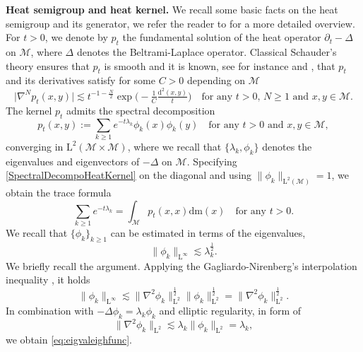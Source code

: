 \documentclass[11pt,a4paper,oneside]{amsart}
\numberwithin{equation}{section}
\newcommand{\dd}{\mathrm{d}}
\newcommand{\LL}{\mathrm{L}}
\newcommand{\m}{\mathrm{m}}
\begin{document}
\medskip
\noindent
\textbf{Heat semigroup and heat kernel. }We recall some basic facts on the heat semigroup and its generator, we refer the reader to \cite[Chapter VI]{chavel1984eigenvalues} for a more detailed overview. For $t>0$, we denote by $p_t$ the fundamental solution of the heat operator $\partial_t-\Delta$ on $\mathcal{M}$, where $\Delta$ denotes the Beltrami-Laplace operator. Classical Schauder's theory ensures that $p_t$ is smooth and it is known, see for instance \cite{stroock1998upper} and \cite[Appendix B]{ambrosio2019finer}, that $p_t$ and its derivatives satisfy for some $C>0$ depending on $\mathcal{M}$
%
\begin{equation}\label{Eq28}
%
\vert\nabla^N p_{t}(x,y)\vert\lesssim t^{-1-\frac{N}{2}}\exp\Big(-\tfrac{1}{C}\tfrac{\dd^2(x,y)}{t}\Big)\quad\text{for any $t>0$, $N\geq 1$ and $x,y\in\mathcal{M}$.}
\end{equation}
%
The kernel $p_t$ admits the spectral decomposition
%
\begin{equation}\label{SpectralDecompoHeatKernel}
%
p_{t}(x,y):=\sum_{k\geq 1}e^{-t\lambda_k}\phi_k(x)\phi_k(y)\quad \text{for any $t>0$ and $x,y\in\mathcal{M}$},
%
\end{equation}
%
converging in $\LL^2(\mathcal{M}\times\mathcal{M})$, where we recall that $\{\lambda_k,\phi_k\}$ denotes the eigenvalues and eigenvectors of $-\Delta$ on $\mathcal{M}$. Specifying \eqref{SpectralDecompoHeatKernel} on the diagonal and using $\|\phi_k\|_{\mathrm{L}^2(\mathcal{M})}=1$, we obtain the trace formula
%
\begin{equation}\label{eq:traceformula}
\sum_{k\geq 1}e^{-t\lambda_k}=\int_{\mathcal{M}}p_t(x,x)\dd\m(x)\quad\text{for any $t>0$.}
\end{equation}
%
We recall that $\{\phi_k\}_{k\geq 1}$ can be estimated in terms of the eigenvalues,
%
\begin{equation}\label{eq:eigvaleighfunc}
%
 \|\phi_k\|_{\LL^{\infty}}\lesssim \lambda^{\frac{1}{2}}_k.
%
\end{equation}
%
We briefly recall the argument. Applying the Gagliardo-Nirenberg's interpolation inequality \cite[Theorem 3.70]{aubin1998some}, it holds
%
$$\|\phi_k\|_{\LL^{\infty}}\lesssim \|\nabla^2 \phi_k\|^{\frac{1}{2}}_{\LL^{2}}\|\phi_k\|^{\frac{1}{2}}_{\LL^2}=\|\nabla^2\phi_k\|^{\frac{1}{2}}_{\LL^2}.$$
%
In combination with $-\Delta\phi_k=\lambda_k\phi_k$ and elliptic regularity, in form of
%
$$\|\nabla^2\phi_k\|_{\LL^2}\lesssim \lambda_k\|\phi_k\|_{\LL^2}=\lambda_k,$$
%
we obtain \eqref{eq:eigvaleighfunc}. 
\end{document}
